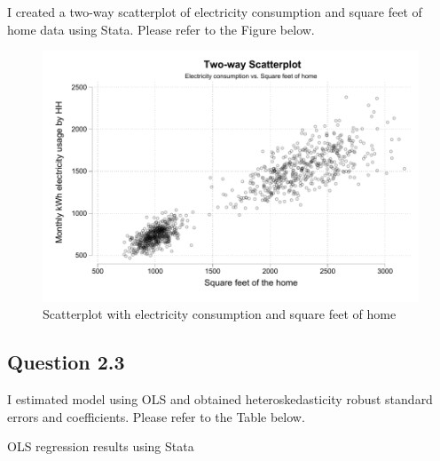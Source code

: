 \documentclass{article}
\begin{document}
I created a two-way scatterplot of electricity consumption and square feet of home data using Stata. Please refer to the Figure below.

\begin{figure}[hbt!]
    \centering
    \includegraphics[scale = 0.7]{homework 2/output/figure/scatterplot.pdf}
    \caption{Scatterplot with electricity consumption and square feet of home}
    \label{tab:scatter}
\end{figure}

\FloatBarrier
\subsection*{Question 2.3}
I estimated model using OLS and obtained heteroskedasticity robust standard errors and coefficients. Please refer to the Table below. 

\begin{table}[hbt!]
    \centering
    
    \caption{OLS regression results using Stata}
     \label{tab:robust_table}
  \end{table}
\end{document}

